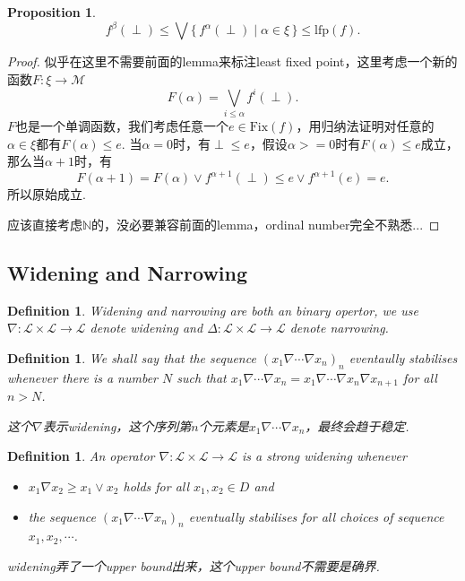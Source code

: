 \documentclass{article}
\newtheorem{proposition}[theorem]{Proposition}
\newtheorem{definition}[theorem]{Definition}
\newcommand*{\xfunc}[4]{{#2}\colon{#3}{#1}{#4}}
\newcommand*{\func}[3]{\xfunc{\to}{#1}{#2}{#3}}
\newcommand\Set[2]{\{\,#1\mid#2\,\}} %
\begin{document}
\begin{proposition}\rm
$$
f^\beta(\perp) \leq \bigvee\Set{f^\alpha(\perp)}{\alpha \in \xi} \leq \text{lfp}(f).
$$
\end{proposition}

\begin{proof}
似乎在这里不需要前面的lemma来标注least fixed point，这里考虑一个新的函数$\func{F}{\xi}{\mathcal{M}}$
$$
F(\alpha) = \bigvee\limits_{i \leq \alpha} f^i(\perp).
$$
$F$也是一个单调函数，我们考虑任意一个$e \in \text{Fix}(f)$，用归纳法证明对任意的$\alpha \in \xi$都有$F(\alpha) \leq e$. 当$\alpha = 0$时，有$\perp \leq e$，假设$\alpha >= 0$时有$F(\alpha) \leq e$成立，那么当$\alpha+1$时，有
$$
F(\alpha+1) = F(\alpha) \vee f^{\alpha+1}(\perp) \leq e \vee f^{\alpha+1}(e) = e.
$$
所以原始成立. 

\color{blue} 应该直接考虑$\mathbb{N}$的，没必要兼容前面的lemma，ordinal number完全不熟悉...
\end{proof}


\newpage 
\subsection{Widening and Narrowing}
\begin{definition}
\rm Widening and narrowing are both an binary opertor, we use $\func{\nabla}{\mathcal{L} \times \mathcal{L}}{\mathcal{L}}$ denote widening and $\func{\Delta}{\mathcal{L} \times \mathcal{L}}{\mathcal{L}}$ denote narrowing.

\end{definition}

\begin{definition}
\rm We shall say that the sequence $(x_1 \nabla \cdots \nabla x_n)_n$ {\color{red} eventaully stabilises} whenever there is a number $N$ such that $x_1 \nabla \cdots \nabla x_n = x_1 \nabla \cdots \nabla x_n \nabla x_{n+1}$ for all $n > N$.

{\color{blue} 这个$\nabla$表示widening，这个序列第$n$个元素是$x_1 \nabla \cdots \nabla x_n$，最终会趋于稳定}.
\end{definition}

\begin{definition}
\rm An operator $\func{\nabla}{\mathcal{L} \times \mathcal{L}}{\mathcal{L}}$ is a {\color{red} strong widening }whenever
\begin{itemize}
	\item $x_1 \nabla x_2 \geq x_1 \vee x_2$ holds for all $x_1,x_2 \in D$ and
	\item the sequence $(x_1 \nabla \cdots \nabla x_n)_n$ eventually stabilises for all choices of sequence $x_1, x_2 ,\cdots$.
\end{itemize}

{\color{blue} widening弄了一个upper bound出来，这个upper bound不需要是确界}.
\end{definition}
\end{document}

